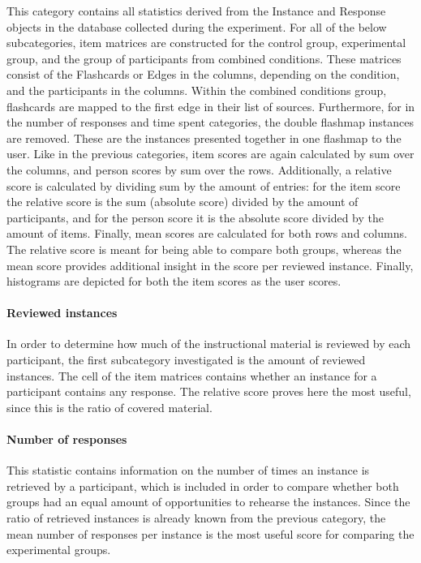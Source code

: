 This category contains all statistics derived from the Instance and Response objects in the database collected during the experiment. For all of the below subcategories, item matrices are constructed for the control group, experimental group, and the group of participants from combined conditions. These matrices consist of the Flashcards or Edges in the columns, depending on the condition, and the participants in the columns. Within the combined conditions group, flashcards are mapped to the first edge in their list of sources. Furthermore, for in the number of responses and time spent categories, the double flashmap instances are removed. These are the instances presented together in one flashmap to the user. Like in the previous categories, item scores are again calculated by sum over the columns, and person scores by sum over the rows. Additionally, a relative score is calculated by dividing sum by the amount of entries: for the item score the relative score is the sum (absolute score) divided by the amount of participants, and for the person score it is the absolute score divided by the amount of items. Finally, mean scores are calculated for both rows and columns. The relative score is meant for being able to compare both groups, whereas the mean score provides additional insight in the score per reviewed instance. Finally, histograms are depicted for both the item scores as the user scores.

\paragraph{Reviewed instances} In order to determine how much of the instructional material is reviewed by each participant, the first subcategory investigated is the amount of reviewed instances. The cell of the item matrices contains whether an instance for a participant contains any response. The relative score proves here the most useful, since this is the ratio of covered material.

\paragraph{Number of responses} This statistic contains information on the number of times an instance is retrieved by a participant, which is included in order to compare whether both groups had an equal amount of opportunities to rehearse the instances. Since the ratio of retrieved instances is already known from the previous category, the mean number of responses per instance is the most useful score for comparing the experimental groups.

